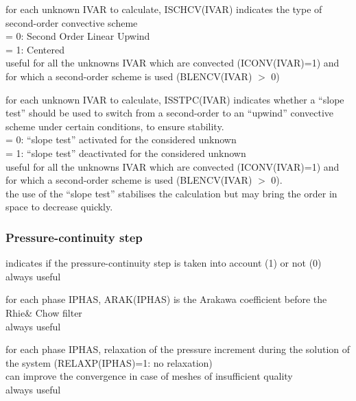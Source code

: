 {for each unknown IVAR to calculate, ISCHCV(IVAR) indicates the type of second-order
convective scheme\\
\hspace*{1.3cm}= 0: Second Order Linear Upwind\\
\hspace*{1.3cm}= 1: Centered\\
useful for all the unknowns IVAR which are convected (ICONV(IVAR)=1) and
for which a second-order scheme is used (BLENCV(IVAR) $>$ 0)}

{for each unknown IVAR to calculate, ISSTPC(IVAR)
indicates whether a ``slope test'' should
be used to switch from a second-order to an ``upwind'' convective
scheme under certain conditions, to ensure stability.\\
\hspace*{1.3cm}= 0: ``slope test'' activated for the considered unknown\\
\hspace*{1.3cm}= 1: ``slope test'' deactivated for the considered unknown\\
useful for all the unknowns IVAR  which are convected (ICONV(IVAR)=1) and
for which a second-order scheme is used (BLENCV(IVAR) $>$ 0).\\
the use of the ``slope test'' stabilises the calculation but may bring
the order in space to decrease quickly.}

\subsubsection{Pressure-continuity step}


{indicates if the pressure-continuity step is taken into account (1) or
not (0)\\
always useful}

{for each phase IPHAS, ARAK(IPHAS) is the Arakawa coefficient before the
Rhie\& Chow filter\\
always useful}

{for each phase IPHAS, relaxation of the pressure increment during the
solution of the system (RELAXP(IPHAS)=1: no relaxation)\\
can improve the convergence in case of
meshes of insufficient quality\\
always useful}

